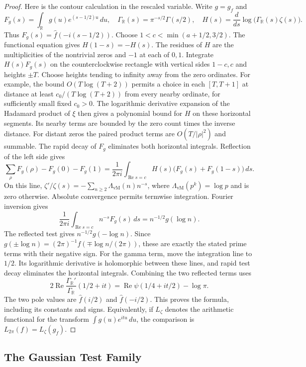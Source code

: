 \begin{proof}
Here is the contour calculation in the rescaled variable.
Write $g=g_f$ and
\[
 F_g(s)=\int_{\mathbb R}g(u)e^{(s-1/2)u}\,du,
 \quad \Gamma_{\mathbb R}(s)=\pi^{-s/2}\Gamma(s/2),
 \quad H(s)=\frac{d}{ds}\log\bigl(\Gamma_{\mathbb R}(s)\zeta(s)\bigr).
\]
Thus $F_g(s)=\widehat f(-i(s-1/2))$.
Choose $1<c<\min(a+1/2,3/2)$.
The functional equation gives $H(1-s)=-H(s)$.
The residues of $H$ are the multiplicities of the nontrivial zeros
and $-1$ at each of $0,1$.
Integrate $H(s)F_g(s)$ on the counterclockwise rectangle with
vertical sides $1-c,c$ and heights $\pm T$.
Choose heights tending to infinity away from the zero ordinates.
For example, the bound $O(T\log(T+2))$ permits a choice in each
$[T,T+1]$ at distance at least $c_0/(T\log(T+2))$ from every
nearby ordinate, for sufficiently small fixed $c_0>0$.
The logarithmic derivative expansion of the Hadamard product of
$\xi$ then gives a polynomial bound for $H$ on these horizontal
segments. Its nearby terms are bounded by the zero count times
the inverse distance. For distant zeros the paired product terms
are $O(T/|\rho|^2)$ and summable.
The rapid decay of $F_g$ eliminates both horizontal integrals.
Reflection of the left side gives
\[
 \sum_\rho F_g(\rho)-F_g(0)-F_g(1)
 =\frac1{2\pi i}\int_{\operatorname{Re}s=c}
 H(s)\bigl(F_g(s)+F_g(1-s)\bigr)\,ds.
\]
On this line,
$\zeta'/\zeta(s)=-\sum_{n\geq2}\Lambda_{\mathrm{vM}}(n)n^{-s}$,
where $\Lambda_{\mathrm{vM}}(p^k)=\log p$ and is zero otherwise.
Absolute convergence permits termwise integration.
Fourier inversion gives
\[
 \frac1{2\pi i}\int_{\operatorname{Re}s=c}n^{-s}F_g(s)\,ds
 =n^{-1/2}g(\log n).
\]
The reflected test gives $n^{-1/2}g(-\log n)$.
Since $g(\pm\log n)=(2\pi)^{-1}f(\mp\log n/(2\pi))$,
these are exactly the stated prime terms with their negative sign.
For the gamma term, move the integration line to $1/2$.
Its logarithmic derivative is holomorphic between these lines,
and rapid test decay eliminates the horizontal integrals.
Combining the two reflected terms uses
\[
 2\operatorname{Re}\frac{\Gamma_{\mathbb R}'}{\Gamma_{\mathbb R}}(1/2+it)
 =\operatorname{Re}\psi(1/4+it/2)-\log\pi.
\]
The two pole values are $\widehat f(i/2)$ and $\widehat f(-i/2)$.
This proves the formula, including its constants and signs.
Equivalently, if $L_\zeta$ denotes the arithmetic functional for
the transform $\int g(u)e^{itu}\,du$, the comparison is
$L_{2\pi}(f)=L_\zeta(g_f)$.
\end{proof}

\subsection{The Gaussian Test Family}
\label{v4-arith:w5-i:gauss-family}

